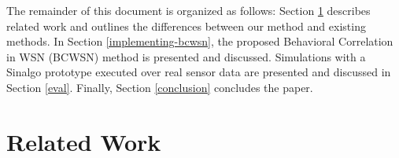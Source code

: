 \documentclass{acm_proc_article-sp}
\begin{document}
% 
% 


The remainder of this document is organized as follows: Section
\ref{related-work} describes related work and outlines the differences between
our method and existing methods. In Section \ref{implementing-bcwsn}, the
proposed Behavioral Correlation in WSN (BCWSN) method is presented and
discussed. Simulations with a Sinalgo \cite{Sinalgo2007} prototype executed over
real sensor data are presented and discussed in Section \ref{eval}. Finally,
Section \ref{conclusion} concludes the paper.


\section{Related Work}
\label{related-work}
\end{document}
